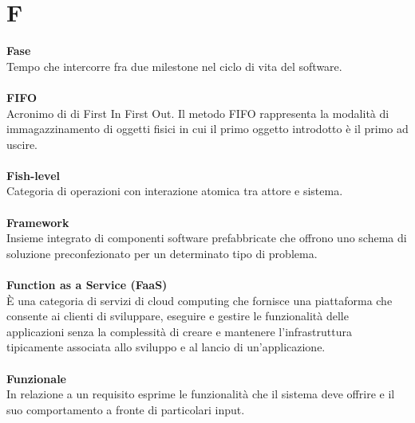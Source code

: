 \section{F}
\textbf{Fase}\\
Tempo che intercorre fra due milestone nel ciclo di vita del software. \\ \\
\textbf{FIFO}\\
Acronimo di di First In First Out. Il metodo FIFO rappresenta la modalità di immagazzinamento di oggetti fisici in cui il primo oggetto introdotto è il primo ad uscire. \\ \\
\textbf{Fish-level}\\
Categoria di operazioni con interazione atomica tra attore e sistema. \\ \\
\textbf{Framework}\\
Insieme integrato di componenti software prefabbricate che offrono uno schema di soluzione preconfezionato per un determinato tipo di problema. \\ \\
\textbf{Function as a Service (FaaS)}\\
È una categoria di servizi di cloud computing che fornisce una piattaforma che consente ai clienti di sviluppare, eseguire e gestire le funzionalità delle applicazioni senza la complessità di creare e mantenere l'infrastruttura tipicamente associata allo sviluppo e al lancio di un'applicazione. \\ \\
\textbf{Funzionale}\\
In relazione a un requisito esprime le funzionalità che il sistema deve offrire e il suo comportamento a fronte di particolari input.\\ 
\clearpage